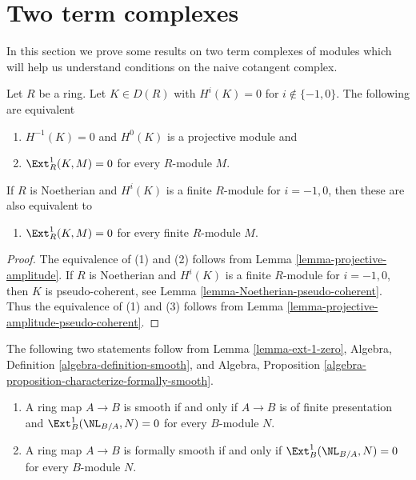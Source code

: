\section{Two term complexes}
\label{section-two-term}

\noindent
In this section we prove some results on two term complexes of modules
which will help us understand conditions on the naive cotangent complex.

\begin{lemma}
\label{lemma-ext-1-zero}
Let $R$ be a ring. Let $K \in D(R)$ with $H^i(K) = 0$ for
$i \not \in \{-1, 0\}$. The following are equivalent
\begin{enumerate}
\item $H^{-1}(K) = 0$ and $H^0(K)$ is a projective module and
\item $\Ext^1_R(K, M) = 0$ for every $R$-module $M$.
\end{enumerate}
If $R$ is Noetherian and $H^i(K)$ is a finite $R$-module for
$i = -1, 0$, then these are also equivalent to
\begin{enumerate}
\item[(3)] $\Ext^1_R(K, M) = 0$ for every finite $R$-module $M$.
\end{enumerate}
\end{lemma}

\begin{proof}
The equivalence of (1) and (2) follows from
Lemma \ref{lemma-projective-amplitude}.
If $R$ is Noetherian and $H^i(K)$ is a finite $R$-module for
$i = -1, 0$, then $K$ is pseudo-coherent, see
Lemma \ref{lemma-Noetherian-pseudo-coherent}.
Thus the equivalence of (1) and (3) follows from
Lemma \ref{lemma-projective-amplitude-pseudo-coherent}.
\end{proof}

\begin{remark}
\label{remark-smoothness-ext-1-zero}
The following two statements follow from Lemma \ref{lemma-ext-1-zero},
Algebra, Definition \ref{algebra-definition-smooth}, and
Algebra, Proposition \ref{algebra-proposition-characterize-formally-smooth}.
\begin{enumerate}
\item A ring map $A \to B$ is smooth if and only if $A \to B$ is
of finite presentation and $\Ext^1_B(\NL_{B/A}, N) = 0$
for every $B$-module $N$.
\item A ring map $A \to B$ is formally smooth if and only if
$\Ext^1_B(\NL_{B/A}, N) = 0$ for every $B$-module $N$.
\end{enumerate}
\end{remark}

